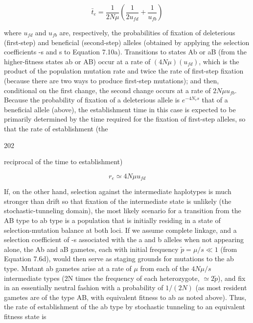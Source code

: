 \documentclass{article}
\begin{document}
\begin{equation}
\bar{t}_{e}=\frac{1}{2N\mu}\left(\frac{1}{2u_{fd}}+\frac{1}{u_{fb}}\right)
\tag{7.46}
\label{eq:7_46}
\end{equation}

where  $ u_{fd} $ and  $ u_{fb} $ are, respectively, the probabilities of fixation of deleterious (first-step) and beneficial (second-step) alleles (obtained by applying the selection coefficients -s and s to Equation 7.10a). Transitions to states Ab or aB (from the higher-fitness states ab or AB) occur at a rate of  $ (4N\mu)(u_{fd}) $, which is the product of the population mutation rate and twice the rate of first-step fixation (because there are two ways to produce first-step mutations); and then, conditional on the first change, the second change occurs at a rate of  $ 2N\mu u_{fb} $. Because the probability of fixation of a deleterious allele is  $ e^{-4N_{e}s} $ that of a beneficial allele (above), the establishment time in this case is expected to be primarily determined by the time required for the fixation of first-step alleles, so that the rate of establishment (the

202

reciprocal of the time to establishment)

\begin{equation}
r_{e}\simeq4N\mu u_{f d}
\tag{7.47}
\label{eq:7_47}
\end{equation}

If, on the other hand, selection against the intermediate haplotypes is much stronger than drift so that fixation of the intermediate state is unlikely (the stochastic-tunneling domain), the most likely scenario for a transition from the AB type to ab type is a population that is initially residing in a state of selection-mutation balance at both loci. If we assume complete linkage, and a selection coefficient of -s associated with the a and b alleles when not appearing alone, the Ab and aB gametes, each with initial frequency  $ \tilde{p} = \mu/s \ll 1 $ (from Equation 7.6d), would then serve as staging grounds for mutations to the ab type. Mutant ab gametes arise at a rate of  $ \mu $ from each of the  $ 4N\mu/s $ intermediate types (2N times the frequency of each heterozygote,  $ \simeq 2\tilde{p} $), and fix in an essentially neutral fashion with a probability of  $ 1/(2N) $ (as most resident gametes are of the type AB, with equivalent fitness to ab as noted above). Thus, the rate of establishment of the ab type by stochastic tunneling to an equivalent fitness state is
\end{document}
